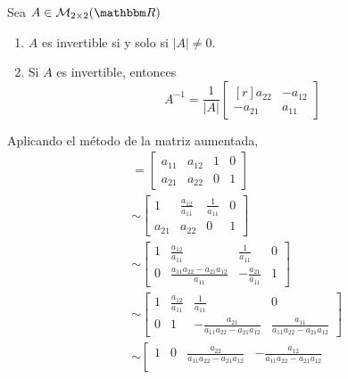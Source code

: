 \begin{theorem}\label{theorem:USJSJSSSJKSIIS}
    Sea $A \in \mathcal{M}_{2 \times 2}(\RR)$
    \begin{enumerate}[label=\roman*)]
        \item $A$ es invertible si y solo si $|A| \neq 0$.
        \item Si $A$ es invertible, entonces
        $$A^{-1} = \frac{1}{|A|} \begin{bmatrix*}[r]
            a_{22} & - a_{12} \\
            -a_{21} & a_{11}
        \end{bmatrix*}$$
    \end{enumerate}
    \demostracion
    Aplicando el método de la matriz aumentada,
    \begin{align*}
        [A \mid I] & = \left[\begin{array}{cc|cc}
            a_{11} & a_{12} & 1 & 0 \\
            a_{21} & a_{22} & 0 & 1
        \end{array}\right] \\
        & \sim \left[\begin{array}{cc|cc}
            1 & \displaystyle \frac{a_{12}}{a_{11}} & \displaystyle \frac{1}{a_{11}} & 0 \\[4mm]
            a_{21} & a_{22} & 0 & 1
        \end{array}\right] \\
        & \sim \left[\begin{array}{cc|cc}
            1 & \displaystyle \frac{a_{12}}{a_{11}} & \displaystyle \frac{1}{a_{11}} & 0 \\[4mm]
            0 & \displaystyle \frac{a_{11}a_{22}-a_{21}a_{12}}{a_{11}} & \displaystyle -\frac{a_{21}}{a_{11}} & 1
        \end{array}\right] \\[2mm]
        & \sim \left[\begin{array}{cc|cc}
            1 & \displaystyle \frac{a_{12}}{a_{11}} & \displaystyle \frac{1}{a_{11}} & 0 \\[4mm]
            0 & 1 & \displaystyle -\frac{a_{21}}{a_{11}a_{22}-a_{21}a_{12}} & \displaystyle \frac{a_{11}}{a_{11}a_{22}-a_{21}a_{12}}
        \end{array}\right] \\[2mm]
        & \sim \left[\begin{array}{cc|cc}
            1 & 0 & \displaystyle \frac{a_{22}}{a_{11}a_{22}-a_{21}a_{12}} & \displaystyle -\frac{a_{12}}{a_{11}a_{22}-a_{21}a_{12}} \\[4mm]

\end{array}
\end{align*}
\end{theorem}
